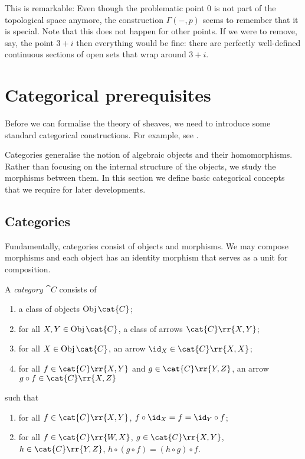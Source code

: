 \documentclass{article}
\begin{document}
This is remarkable: Even though the problematic point $0$ is not part
of the topological space anymore, the construction $\Gamma(-,p)$
seems to remember that it is special. Note that this does not happen
for other points. If we were to remove, say, the point $3+i$ then
everything would be fine: there are perfectly well-defined continuous
sections of open sets that wrap around $3+i$.

\section{Categorical prerequisites}\label{sec:categories_and_functors}

Before we can formalise the theory of sheaves, we need to introduce some
standard categorical constructions. For example, see \cite{maclane1997}.

Categories generalise the notion of algebraic objects and their homomorphisms.
Rather than focusing on the internal structure of the objects, we study the
morphisms between them. In this section we define basic categorical concepts that
we require for later developments.

\subsection{Categories}

Fundamentally, categories consist of objects and morphisms. We may compose morphisms
and each object has an identity morphism that serves as a unit for composition.

\begin{definition}\label{def:category}
  A \emph{category} $\cat C$ consists of
  \begin{enumerate}
    \item a class of objects $\Obj {\cat{C}}$;
    \item for all $X,Y\in\Obj {\cat{C}}$, a class of arrows $\cat{C}\rr{X,Y}$;
    \item for all $X\in\Obj {\cat{C}}$, an arrow $\id_X\in\cat{C}\rr{X,X}$;
    \item for all $f\in\cat{C}\rr{X,Y}$ and $g\in\cat{C}\rr{Y,Z}$, an arrow
      $g\circ f\in\cat{C}\rr{X,Z}$
  \end{enumerate}
  such that
  \begin{enumerate}
    \item for all $f\in\cat{C}\rr{X,Y}$, $f\circ \id_X = f = \id_Y\circ f$;
    \item for all $f\in\cat{C}\rr{W,X}$, $g\in\cat{C}\rr{X,Y}$, $h\in\cat{C}\rr{Y,Z}$,
      $h\circ(g\circ f)=(h\circ g)\circ f$.
  \end{enumerate}
\end{definition}
\end{document}
